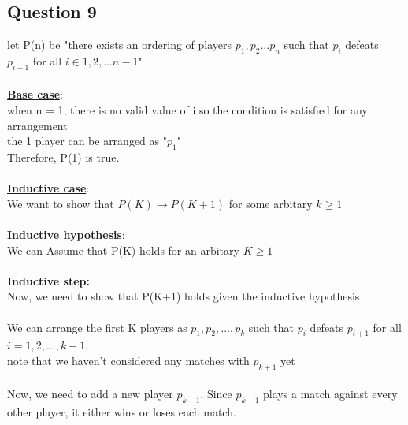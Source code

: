 \documentclass[11pt]{article}
\begin{document}
{{{\subsection*{Question 9}
let P(n) be "there exists an ordering of players $p_1, p_2...p_n$
such that $p_i$ defeats $p_{i+1}$ for all $i \in 1, 2, ... n-1$"\\\\
%
\underline{\textbf{Base case}}: \\
when n = 1, there is no valid value of i so the condition is satisfied for any arrangement \\
the 1 player can be arranged as "$p_1$" \\
Therefore, P(1) is true.
\\ \\
\underline{\textbf{Inductive case}}: \\
We want to show that $P(K) \rightarrow P(K+1)$ for some arbitary $k \geq 1$ \\
\\
\textbf{Inductive hypothesis}: \\
We can Assume that P(K) holds for an arbitary $K \geq 1$ \\
\\
\textbf{Inductive step:} \\
Now, we need to show that P(K+1) holds given the inductive hypothesis \\
\\
We can arrange the first K players as $p_1, p_2, \ldots, p_k$
such that $p_i$ defeats $p_{i+1}$ for all
$i = 1, 2, \ldots, k-1$. \\
note that we haven't considered any matches with $p_{k+1}$ yet \\
\\
Now, we need to add a new player $p_{k+1}$. Since $p_{k+1}$
plays a match against every other player, it either wins or loses each match.\\

}}}
\end{document}
